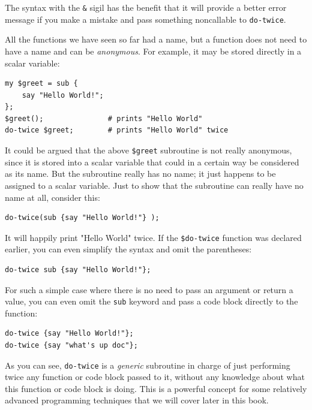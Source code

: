 The syntax with the \verb"&" sigil has the benefit that 
it will provide a better error message if you make a mistake 
and pass something noncallable to \verb"do-twice". 

All the functions we have seen so far had a name, but a 
function does not need to have a name and can be \emph{anonymous}. 
For example, it may be stored directly in a scalar variable:

\begin{verbatim}
my $greet = sub {
    say "Hello World!";
};
$greet();               # prints "Hello World"
do-twice $greet;        # prints "Hello World" twice
\end{verbatim}

It could be argued that the above \verb"$greet" subroutine  
is not really anonymous, since it is stored into a scalar 
variable that could in a certain way be considered as its name. 
But the subroutine really has no name; it just happens to be 
assigned to a scalar variable. Just to show that the subroutine 
can really have no name at all, consider this:

\begin{verbatim}
do-twice(sub {say "Hello World!"} );
\end{verbatim}

It will happily print "Hello World" twice. If the \verb"$do-twice"
function was declared earlier, you can even simplify the syntax 
and omit the parentheses:

\begin{verbatim}
do-twice sub {say "Hello World!"};
\end{verbatim}

For such a simple case where there is no need to pass an 
argument or return a value, you can even omit the 
\verb"sub" keyword and pass a code block directly to the function:

\begin{verbatim}
do-twice {say "Hello World!"};
do-twice {say "what's up doc"};
\end{verbatim}

As you can see, \verb"do-twice" is a \emph{generic} subroutine in 
charge of just performing twice any function or code 
block passed to it, without any knowledge about what 
this function or code block is doing. This is a powerful 
concept for some relatively advanced programming techniques 
that we will cover later in this book.

